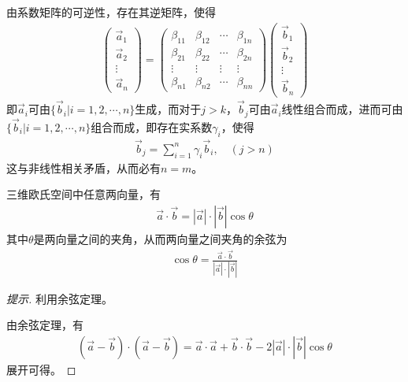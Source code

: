 \begin{example}
  由系数矩阵的可逆性，存在其逆矩阵，使得
  \begin{align*}
    \begin{pmatrix}\vec a_1 \\ \vec a_2 \\ \vdots \\ \vec a_n\end{pmatrix}=
    \begin{pmatrix}
      \beta_{11} & \beta_{12} & \cdots & \beta_{1n}\\
      \beta_{21} & \beta_{22} & \cdots & \beta_{2n}\\
      \vdots     & \vdots     & \vdots & \vdots    \\
      \beta_{n1} & \beta_{n2} & \cdots & \beta_{nn}
    \end{pmatrix}
    \begin{pmatrix}\vec b_1 \\ \vec b_2 \\ \vdots \\ \vec b_n\end{pmatrix}
  \end{align*}
  即$\vec a_i$可由$\{\vec b_i|i=1,2,\cdots,n\}$生成，而对于$j>k$，$\vec b_j$可由$\vec a_i$线性组合而成，进而可由$\{\vec b_i|i=1,2,\cdots,n\}$组合而成，即存在实系数$\gamma_i$，使得
  \begin{align*}
    \vec b_j = \sum_{i=1}^n \gamma_i \vec b_i,\quad(j>n)
  \end{align*}
  这与非线性相关矛盾，从而必有$n=m$。
\end{example}

\begin{theorem}
  三维欧氏空间中任意两向量，有
  \begin{align*}
    \vec{a}\cdot \vec b=\left|\vec a\right| \cdot \left|\vec b\right| \cos\theta
  \end{align*}
  其中$\theta$是两向量之间的夹角，从而两向量之间夹角的余弦为
  \begin{align*}
    \cos\theta = \frac{\vec a\cdot \vec b}{\left|\vec a\right| \cdot \left|\vec b\right|}
  \end{align*}
\end{theorem}
\begin{proof}[提示]
  利用余弦定理。
  \begin{center}
  \end{center}
  由余弦定理，有
  \begin{align*}
    (\vec a-\vec b)\cdot(\vec a-\vec b) = \vec a\cdot \vec a + \vec b\cdot\vec b
    - 2\left|\vec a\right|\cdot\left|\vec b\right|\cos\theta
  \end{align*}
  展开可得。
\end{proof}


